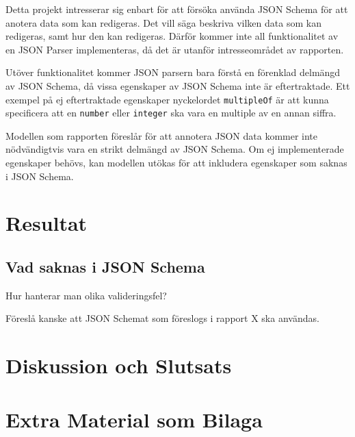 \documentclass[swedish]{kththesis}
\begin{document}
Detta projekt intresserar sig enbart för att försöka använda JSON Schema för att anotera data som kan redigeras. Det vill säga beskriva vilken data som kan redigeras, samt hur den kan redigeras. Därför kommer inte all funktionalitet av en JSON Parser implementeras, då det är utanför intresseområdet av rapporten.

Utöver funktionalitet kommer JSON parsern bara förstå en förenklad delmängd av JSON Schema, då vissa egenskaper av JSON Schema inte är eftertraktade. Ett exempel på ej eftertraktade egenskaper nyckelordet \texttt{multipleOf} är att kunna specificera att en \texttt{number} eller \texttt{integer} ska vara en multiple av en annan siffra.

Modellen som rapporten föreslår för att annotera JSON data kommer inte nödvändigtvis vara en strikt delmängd av JSON Schema. Om ej implementerade egenskaper behövs, kan modellen utökas för att inkludera egenskaper som saknas i JSON Schema.

\chapter{Resultat}

\section{Vad saknas i JSON Schema}
Hur hanterar man olika valideringsfel?

Föreslå kanske att JSON Schemat som föreslogs i rapport X ska användas.

\chapter{Diskussion och Slutsats}

\printbibliography[heading=bibintoc] %

\appendix

\chapter{Extra Material som Bilaga}
\end{document}
